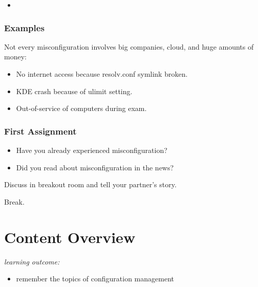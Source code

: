 {\begin{frame}
\begin{itemize}
			\textcolor{white}{}
		\item   \textcolor{white}{}
			\textcolor{white}{}
	\end{itemize}
\end{frame}
\begin{frame}
	\frametitle{Examples}
	Not every misconfiguration involves big companies, cloud, and huge amounts of money:
	\begin{itemize}
		\item No internet access because resolv.conf symlink broken.
		\item KDE crash because of ulimit setting.
		\item Out-of-service of computers during exam.
	\end{itemize}
\end{frame}
}
\begin{assignment}
	\frametitle{First Assignment}
	\begin{itemize}
		\item Have you already experienced misconfiguration?
		\item Did you read about misconfiguration in the news?
	\end{itemize}
	\begin{task}
	Discuss in breakout room and tell your partner's story.
	\end{task}
\end{assignment}

\begin{assignment}
	\begin{task}
	Break.
	\end{task}
\end{assignment}

\section{Content Overview}

\begin{frame}
	\textit{learning outcome:}
	\begin{itemize}
		\item remember the topics of configuration management
	\end{itemize}
\end{frame}

